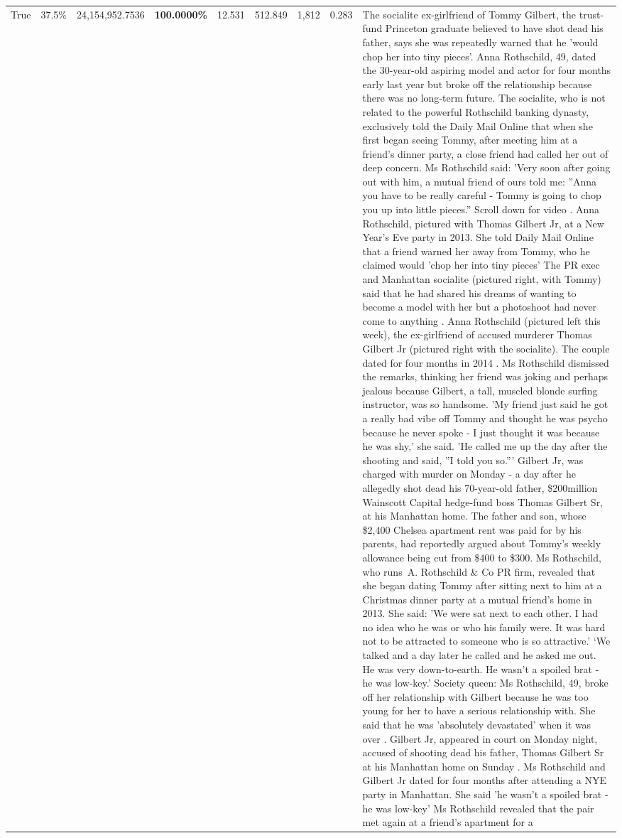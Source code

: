 \begin{table}[H]
\begin{tabular}{lllrlllll}
True & 37.5\% & 24,154,952.7536 & \bfseries \color{red} 100.0000\% & 12.531 & 512.849 & 1,812 & 0.283 & The socialite ex-girlfriend of Tommy Gilbert, the trust-fund Princeton graduate believed to have shot dead his father, says she was repeatedly warned that he 'would chop her into tiny pieces'. Anna Rothschild, 49, dated the 30-year-old aspiring model and actor for four months early last year but broke off the relationship because there was no long-term future. The socialite, who is not related to the powerful Rothschild banking dynasty, exclusively told the Daily Mail Online that when she first began seeing Tommy, after meeting him at a friend's dinner party, a close friend had called her out of deep concern. Ms Rothschild said: 'Very soon after going out with him, a mutual friend of ours told me: ''Anna you have to be really careful - Tommy is going to chop you up into little pieces.'' Scroll down for video . Anna Rothschild, pictured with Thomas Gilbert Jr, at a New Year's Eve party in 2013. She told Daily Mail Online that a friend warned her away from Tommy, who he claimed would 'chop her into tiny pieces' The PR exec and Manhattan socialite (pictured right, with Tommy) said that he had shared his dreams of wanting to become a model with her but a photoshoot had never come to anything . Anna Rothschild (pictured left this week), the ex-girlfriend of accused murderer Thomas Gilbert Jr (pictured right with the socialite). The couple dated for four months in 2014 . Ms Rothschild dismissed the remarks, thinking her friend was joking and perhaps jealous because Gilbert, a tall, muscled blonde surfing instructor, was so handsome. 'My friend just said he got a really bad vibe off Tommy and thought he was psycho because he never spoke - I just thought it was because he was shy,' she said. 'He called me up the day after the shooting and said, ''I told you so.''' Gilbert Jr, was charged with murder on Monday - a day after he allegedly shot dead his 70-year-old father, \$200million Wainscott Capital hedge-fund boss Thomas Gilbert Sr, at his Manhattan home. The father and son, whose \$2,400 Chelsea apartment rent was paid for by his parents, had reportedly argued about Tommy's weekly allowance being cut from \$400 to \$300. Ms Rothschild, who runs A. Rothschild \& Co PR firm, revealed that she began dating Tommy after sitting next to him at a Christmas dinner party at a mutual friend's home in 2013. She said: 'We were sat next to each other. I had no idea who he was or who his family were. It was hard not to be attracted to someone who is so attractive.' ‘We talked and a day later he called and he asked me out. He was very down-to-earth. He wasn’t a spoiled brat - he was low-key.’ Society queen: Ms Rothschild, 49, broke off her relationship with Gilbert because he was too young for her to have a serious relationship with. She said that he was 'absolutely devastated' when it was over . Gilbert Jr, appeared in court on Monday night, accused of shooting dead his father, Thomas Gilbert Sr at his Manhattan home on Sunday . Ms Rothschild and Gilbert Jr dated for four months after attending a NYE party in Manhattan. She said 'he wasn't a spoiled brat - he was low-key' Ms Rothschild revealed that the pair met again at a friend’s apartment for a 
\end{tabular}
\end{table}
